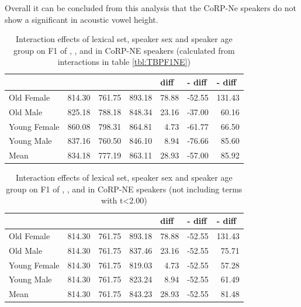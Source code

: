\documentclass[../../00.FullDoc/tex/Thesis]{subfiles}
\begin{document}
Overall it can be concluded from this analysis that the CoRP-Ne speakers do not show a significant \TB{} in acoustic vowel height.



\begin{table}[htbp]
	\centering
	\begin{tabular}{lrrrrrr}
		\hline
		& \multicolumn{1}{l}{\bath{}} & \multicolumn{1}{l}{\palm{}} & \multicolumn{1}{l}{\trap{}} & \multicolumn{1}{l}{\TB{} diff} & \multicolumn{1}{l}{\palm{}-\bath{} diff} & \multicolumn{1}{l}{\trap{}-\palm{} diff} \\
		\hline
		Old Female & 814.30 & 761.75 & 893.18 & 78.88 & -52.55 & 131.43 \\
		Old Male & 825.18 & 788.18 & 848.34 & 23.16 & -37.00 & 60.16 \\
		Young Female & 860.08 & 798.31 & 864.81 & 4.73  & -61.77 & 66.50 \\
		Young Male & 837.16 & 760.50 & 846.10 & 8.94  & -76.66 & 85.60 \\
		Mean  & 834.18 & 777.19 & 863.11 & 28.93 & -57.00 & 85.92 \\
		\hline
	\end{tabular}%
	\caption{Interaction effects of lexical set, speaker sex and speaker age group on F1 of \trap{}, \bath{}, and \palm{} in CoRP-NE speakers (calculated from interactions in table \ref{tbl:TBPF1NE})} \label{TBPF1NE-inter}%
\end{table}%

\begin{table}[htbp]
	\centering
	\begin{tabular}{lrrrrrr}
		& \multicolumn{1}{l}{\bath{}} & \multicolumn{1}{l}{\palm{}} & \multicolumn{1}{l}{\trap{}} & \multicolumn{1}{l}{\TB{} diff} & \multicolumn{1}{l}{\palm{}-\bath{} diff} & \multicolumn{1}{l}{\trap{}-\palm{} diff} \\
		\hline
		Old Female & 814.30 & 761.75 & 893.18 & 78.88 & -52.55 & 131.43 \\
		Old Male & 814.30 & 761.75 & 837.46 & 23.16 & -52.55 & 75.71 \\
		Young Female & 814.30 & 761.75 & 819.03 & 4.73  & -52.55 & 57.28 \\
		Young Male & 814.30 & 761.75 & 823.24 & 8.94  & -52.55 & 61.49 \\
		\hline
		Mean  & 814.30 & 761.75 & 843.23 & 28.93 & -52.55 & 81.48 \\
	\end{tabular}%
	\caption{Interaction effects of lexical set, speaker sex and speaker age group on F1 of \trap{}, \bath{}, and \palm{} in CoRP-NE speakers (not including terms with t<2.00)} \label{TBPF1NE-inter2}%
\end{table}%
\end{document}
